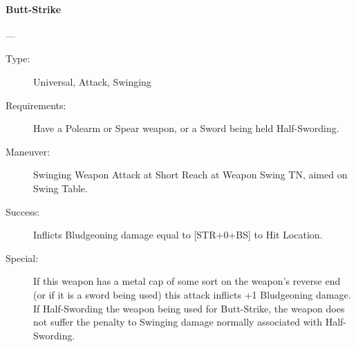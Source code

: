 \documentclass[oneside,11pt,english]{book}
\begin{document}
\paragraph{\large\label{man:Butt-Strike}Butt-Strike}---\quad{\large[X]}
\begin{description}
\item [Type:] Universal, Attack, Swinging 
\item [Requirements:] Have a Polearm or Spear weapon, or a Sword being held
  Half-Swording.  
\item [Maneuver:] Swinging Weapon Attack at Short Reach at Weapon Swing TN,
  aimed on Swing Table.  
\item [Success:] Inflicts Bludgeoning damage equal to [STR+0+BS] to Hit Location.
\item [Special:] If this weapon has a metal cap of some sort on the weapon’s
  reverse end (or if it is a sword being used) this attack inflicts +1
  Bludgeoning damage.  If Half-Swording the weapon being used for Butt-Strike,
  the weapon does not suffer the penalty to Swinging damage normally associated
  with Half-Swording.  
\end{description}
\end{document}
